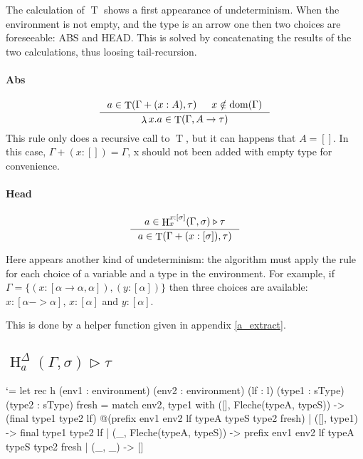 \documentclass{article}
\let\origlstlisting=\lstlisting
\let\endoriglstlisting=\endlstlisting
\renewenvironment{lstlisting}
{\mathcode`\-=\hyphenmathcode
    \everymath{}\mathsurround=0pt\origlstlisting}
{\endoriglstlisting}
\DeclareMathOperator{\iT}{T}
\DeclareMathOperator{\iH}{H}
\DeclareMathOperator{\iDom}{dom}
\DeclareMathOperator{\iLambda}{\lambda}
\begin{document}
The calculation of $\iT$ shows a first appearance of undeterminism. When the environment is not empty, and the type is an arrow one then two choices are foreseeable: ABS and HEAD.  This is solved by concatenating the results of the two calculations, thus loosing tail-recursion.

\paragraph{Abs}
\begin{displaymath}
    \inference[]{a \in \iT(\Gamma + (x : A), \tau) & x \notin \iDom(\Gamma)}{\iLambda x.a \in \iT(\Gamma, A \rightarrow \tau)}
\end{displaymath}
This rule only does a recursive call to $\iT$, but it can happens that $A = []$. In this case, $\Gamma + (x : []) = \Gamma$, x should not been added with empty type for convenience. 

\paragraph{Head}
\begin{displaymath}
    \inference[]{a \in \iH^{x:[\sigma]}_x(\Gamma, \sigma) \triangleright \tau}{a \in\iT(\Gamma + (x:[\sigma]), \tau) }
\end{displaymath}

Here appears another kind of undeterminism: the algorithm must apply the rule for each choice of a variable and a type in the environment. For example, if $\Gamma = \{(x : [\alpha \rightarrow \alpha, \alpha]), (y : [\alpha])\}$ then three choices are available: $x : [\alpha -> \alpha]$, $x : [\alpha]$ and $y : [\alpha]$.

This is done by a helper function given in appendix \ref{a_extract}.

\subsection{$\iH^\Delta_a(\Gamma, \sigma) \triangleright \tau$}
\begin{lstlisting}
let rec h (env1 : environment) (env2 : environment) (lf : l) 
    (type1 : sType) (type2 : sType) fresh =
  match env2, type1 with
    ([], Fleche(typeA, typeS)) -> 
        (final type1 type2 lf)
            @(prefix env1 env2 lf typeA typeS type2 fresh)
    | ([], type1) -> final type1 type2 lf
    | (_, Fleche(typeA, typeS)) -> 
        prefix env1 env2 lf typeA typeS type2 fresh
    | (_, _) -> []
\end{lstlisting}
\end{document}
